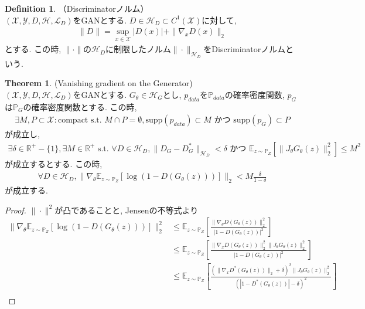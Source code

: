\documentclass[11pt, a4paper, dvipdfmx]{jsarticle}
\theoremstyle{definition}
\newtheorem{Definition+}[Axiom+]{Definition}
\newtheorem{Theorem+}[Axiom+]{Theorem}
\newcommand{\R}{\mathbb{R}}
\newcommand{\X}{\mathcal{X}}
\newcommand{\Y}{\mathcal{Y}}
\newcommand{\Hil}{\mathcal{H}}
\newcommand{\Loss}{\mathcal{L}_{D}}
\newcommand{\MLsp}{(\X, \Y, D, \Hil, \Loss)}
\begin{document}
\begin{Definition+}（Discriminatorノルム）\\
    $\MLsp$をGANとする. $D\in\Hil_{D}\subset C^{1}(\X)$に対して, 
    \begin{align*}
        \|D\| = \sup_{x\in\X}|D(x)| + \|\nabla_{x}D(x)\|_{2}
    \end{align*}
    とする. この時, $\|\cdot\|$の$\Hil_{D}$に制限したノルム$\|\cdot\|_{\Hil_{D}}$をDiscriminatorノルムという.
\end{Definition+}
\begin{Theorem+}(Vanishing gradient on the Generator)\\
    $\MLsp$をGANとする. $G_{\theta}\in\Hil_{G}$とし, $p_{data}$を$\mathbb{P}_{data}$の確率密度関数, $p_{G}$は$\mathbb{P}_{G}$の確率密度関数とする. この時, 
    \begin{align*}
        \exists M, P\subset\X:\text{compact s.t. }M\cap P = \emptyset, \text{supp}(p_{data})\subset M\text{ かつ }\text{supp}(p_{G})\subset P
    \end{align*}
    が成立し, 
    \begin{align*}
        \exists\delta\in\R^{+}-\{1\}, \exists M\in\R^{+}\text{ s.t. }\forall D\in\Hil_{D}, \|D_{G} - D_{G}^{*}\|_{\Hil_{D}} <\delta\text{ かつ }\mathbb{E}_{z\sim\mathbb{P}_{Z}}[\|J_{\theta}G_{\theta}(z)\|_{2}^{2}] \leq M^{2}
    \end{align*}
    が成立するとする. この時, 
    \begin{align*}
        \forall D\in\Hil_{D}, \|\nabla_{\theta}\mathbb{E}_{z\sim\mathbb{P}_{Z}}[\log(1 - D(G_{\theta}(z)))]\|_{2} < M\frac{\delta}{1 - \delta}
    \end{align*}
    が成立する.
    \begin{proof}
        $\|\cdot\|^{2}$が凸であることと, Jensenの不等式より
        \begin{align*}
            \|\nabla_{\theta}\mathbb{E}_{z\sim\mathbb{P}_{Z}}[\log(1 - D(G_{\theta}(z)))]\|_{2}^{2} &\leq\mathbb{E}_{z\sim\mathbb{P}_{Z}}\left[ \frac{\|\nabla_{\theta}D(G_{\theta}(z))\|_{2}^{2}}{|1 - D(G_{\theta}(z))|^{2}} \right]\\
                                                                                                    &\leq\mathbb{E}_{z\sim\mathbb{P}_{Z}}\left[ \frac{\|\nabla_{x}D(G_{\theta}(z))\|_{2}^{2}\|J_{\theta}G_{\theta}(z)\|_{2}^{2}}{|1 - D(G_{\theta}(z))|^{2}} \right]\\
                                                                                                    &\leq\mathbb{E}_{z\sim\mathbb{P}_{Z}}\left[ \frac{(\|\nabla_{x}D^{*}(G_{\theta}(z))\|_{2} + \delta)^{2}\|J_{\theta}G_{\theta}(z)\|_{2}^{2}}{(|1 - D^{*}(G_{\theta}(z))| - \delta)^{2}} \right]\\

\end{align*}
\end{proof}
\end{Theorem+}
\end{document}
